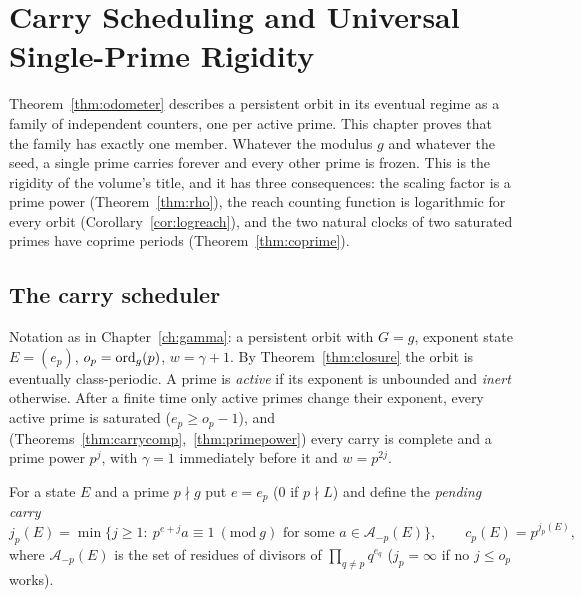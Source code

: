 \chapter{Carry Scheduling and Universal Single-Prime Rigidity}\label{ch:schedule}

Theorem~\ref{thm:odometer} describes a persistent orbit in its eventual regime as a family of independent counters, one per active prime. This chapter proves that the family has exactly one member. Whatever the modulus \(g\) and whatever the seed, a single prime carries forever and every other prime is frozen. This is the rigidity of the volume's title, and it has three consequences: the scaling factor is a prime power (Theorem~\ref{thm:rho}), the reach counting function is logarithmic for every orbit (Corollary~\ref{cor:logreach}), and the two natural clocks of two saturated primes have coprime periods (Theorem~\ref{thm:coprime}).

\section{The carry scheduler}

Notation as in Chapter~\ref{ch:gamma}: a persistent orbit with \(G=g\), exponent state \(E=(e_p)\), \(o_p=\operatorname{ord}_g(p)\), \(w=\gamma+1\). By Theorem~\ref{thm:closure} the orbit is eventually class-periodic. A prime is \emph{active} if its exponent is unbounded and \emph{inert} otherwise. After a finite time only active primes change their exponent, every active prime is saturated (\(e_p\ge o_p-1\)), and (Theorems~\ref{thm:carrycomp},~\ref{thm:primepower}) every carry is complete and a prime power \(p^j\), with \(\gamma=1\) immediately before it and \(w=p^{2j}\).

For a state \(E\) and a prime \(p\nmid g\) put \(e=e_p\) (0 if \(p\nmid L\)) and define the \emph{pending carry}
\[
j_p(E)=\min\{j\ge1:\ p^{e+j}a\equiv1\ (\mathrm{mod}\ g)\text{ for some }a\in\mathcal A_{-p}(E)\},\qquad c_p(E)=p^{j_p(E)},
\]
where \(\mathcal A_{-p}(E)\) is the set of residues of divisors of \(\prod_{q\ne p}q^{e_q}\) (\(j_p=\infty\) if no \(j\le o_p\) works).

